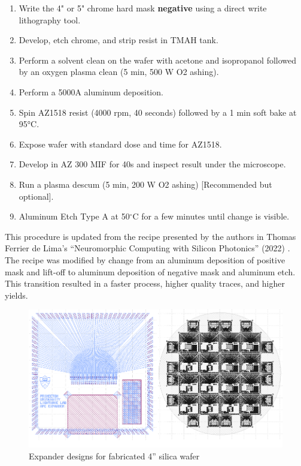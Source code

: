 \begin{enumerate}
    \item Write the 4" or 5" chrome hard mask \textbf{negative} using a direct write lithography tool. 
    \item Develop, etch chrome, and strip resist in TMAH tank. 
    \item Perform a solvent clean on the wafer with acetone and isopropanol followed by an oxygen plasma clean (5 min, 500 W O2 ashing).
    \item Perform a 5000A aluminum deposition. 
    \item Spin AZ1518 resist (4000 rpm, 40 seconds) followed by a 1 min soft bake at 95°C. 
    \item Expose wafer with standard dose and time for AZ1518.
    \item Develop in AZ 300 MIF for 40s and inspect result under the microscope.
    \item Run a plasma descum (5 min, 200 W O2 ashing) [Recommended but optional].
    \item Aluminum Etch Type A at 50$^{\circ}$C for a few minutes until change is visible.
\end{enumerate}

\qquad This procedure is updated from the recipe presented by the authors in Thomas Ferrier de Lima’s  “Neuromorphic Computing with Silicon Photonics” (2022) \cite{deLimaThesis}. The recipe was modified by change from an aluminum deposition of positive mask and lift-off to aluminum deposition of negative mask and aluminum etch. This transition resulted in a faster process, higher quality traces, and higher yields. 

\begin{figure}[!ht]
\centering
\includegraphics[width=5in]{./Figures/AppendixA/FigAppA02}
\caption{Expander designs for fabricated 4” silica wafer}
\label{FigAppA2}
\end{figure}

